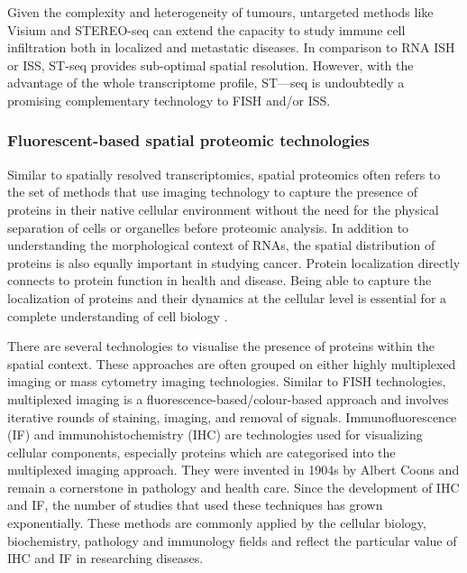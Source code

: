 Given the complexity and heterogeneity of tumours, untargeted methods like Visium and STEREO-seq can extend the capacity to study immune cell infiltration both in localized and metastatic diseases. In comparison to RNA ISH or ISS, ST-seq provides sub-optimal spatial resolution. However, with the advantage of the whole transcriptome profile, ST—seq is undoubtedly a promising complementary technology to FISH and/or ISS.  

\subsubsection{Fluorescent-based spatial proteomic technologies}
Similar to spatially resolved transcriptomics, spatial proteomics often refers to the set of methods that use imaging technology to capture the presence of proteins in their native cellular environment without the need for the physical separation of cells or organelles before proteomic analysis. In addition to understanding the morphological context of RNAs, the spatial distribution of proteins is also equally important in studying cancer. Protein localization directly connects to protein function in health and disease. Being able to capture the localization of proteins and their dynamics at the cellular level is essential for a complete understanding of cell biology \cite{lundberg2019spatial}. 

There are several technologies to visualise the presence of proteins within the spatial context. These approaches are often grouped on either highly multiplexed imaging or mass cytometry imaging technologies. Similar to FISH technologies, multiplexed imaging is a fluorescence-based/colour-based approach and involves iterative rounds of staining, imaging, and removal of signals. Immunofluorescence (IF) and immunohistochemistry (IHC) are technologies used for visualizing cellular components, especially proteins which are categorised into the multiplexed imaging approach. They were invented in 1904s by Albert Coons \cite{coons1941immunological} and remain a cornerstone in pathology and health care. Since the development of IHC and IF, the number of studies that used these techniques has grown exponentially. These methods are commonly applied by the cellular biology, biochemistry, pathology and immunology fields and reflect the particular value of IHC and IF in researching diseases.        

